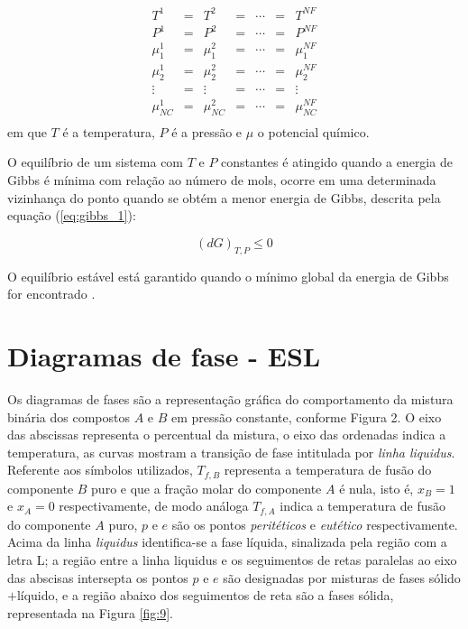 \begin{equation}\label{eq:equi_fase_1}
	\begin{array}{ccccccc}
    	T^{1}&=&T^{2}&=&\cdots&=&T^{NF}\\
	P^{1}&=&P^{2}&=&\cdots&=&P^{NF}\\
	\mu_{1}^{1}&=&\mu_{1}^{2}&=&\cdots&=&\mu_{1}^{NF}\\
	\mu_{2}^{1}&=&\mu_{2}^{2}&=&\cdots&=&\mu_{2}^{NF}\\
	\vdots&=&\vdots&=&\cdots&=&\vdots\\
	\mu_{NC}^{1}&=&\mu_{NC}^{2}&=&\cdots&=&\mu_{NC}^{NF}\\
	\end{array} 
\end{equation}
em que $T$ é a temperatura, $P$ é a pressão e $\mu$ o potencial químico.

O equilíbrio de um sistema com $T$ e $P$ constantes é atingido quando a energia de Gibbs é mínima com relação ao número de mols, ocorre em uma determinada vizinhança do ponto quando se obtém a menor energia de Gibbs, descrita pela equação (\ref{eq:gibbs_1}):
	
\begin{equation}\label{eq:gibbs_1}
	(dG)_{T,P}\leq 0
\end{equation}

O equilíbrio estável está garantido quando o mínimo global da energia de Gibbs for encontrado \cite{Rocha2011}.

\section{Diagramas de fase - ESL}
	
Os diagramas de fases são a representação gráfica do comportamento da mistura binária dos compostos $A$ e $B$ em pressão constante, conforme Figura 2. O eixo das abscissas representa o percentual da mistura, o eixo das ordenadas indica a temperatura, as curvas mostram a transição de fase intitulada por \textit{linha liquidus}. Referente aos símbolos utilizados, $T_{f,B}$ representa a temperatura de fusão do componente $B$ puro e que a fração molar do componente $A$ é nula, isto é, $x_B=1$ e $x_A=0$ respectivamente, de modo análoga $T_{f,A}$ indica a temperatura de fusão do componente $A$ puro, $p$ e $e$ são os pontos \textit{peritéticos} e \textit{eutético} respectivamente. Acima da linha \textit{liquidus} identifica-se a fase líquida, sinalizada pela região com a letra L; a região entre a linha liquidus e os seguimentos de retas paralelas ao eixo das abscisas intersepta os pontos $p$ e $e$ são designadas por misturas de fases sólido$+$líquido, e a região abaixo dos seguimentos de reta são a fases sólida, representada na Figura \ref{fig:9}. \cite{Rocha2011}
	
